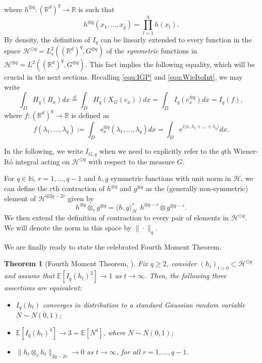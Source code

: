 \documentclass[12pt]{article}
\DeclareMathOperator{\1}{1}
\newcommand{\R}{\mathbb{R}}
\newcommand{\E}{\mathbb{E}}
\newcommand{\scp}[1]{\langle #1 \rangle}
\theoremstyle{plain}
\newtheorem{theorem}{Theorem}
\theoremstyle{definition}
\begin{document}
where $h^{\otimes q}:(\R^d)^q \to \R$ is such that \begin{equation}\label{equ:tensorproduct}
    h^{\otimes q} (x_1,\ldots,x_q) = \prod_{l=1}^q h(x_l).
\end{equation} 
By density, the definition of $I_q$ can be linearly extended to every function in the space $\mathcal{H}^{\odot q} = L^2_{s}((\R^{d})^q, G^{\otimes q})$ of the {\it symmetric} functions in $\mathcal{H}^{\otimes q} = L^2((\R^{d})^q, G^{\otimes q})$.  {This fact implies the following equality, which will be crucial in the next sections. Recalling \eqref{equ:IGP} and \eqref{equ:WieItoInt}, we may write
\begin{equation}
\int_{D}H_q\left(B_x\right)dx  \overset{d}{=} \int_{D}H_q\left(X_G(e_x)\right)dx =\int_{D}I_q\left(e_x^{\otimes q}\right)dx = I_{q}(f),
\end{equation}
where $f:(\R^{d})^q\rightarrow \R$ is defined as 
\begin{equation}
    f(\lambda_1,\dots,\lambda_q) := \int_{D}\mathrm e_x^{\otimes q}( \lambda_1,\dots,\lambda_q)   dx = \int_{D}\mathrm e^{i\langle x, \lambda_1+\dots+\lambda_q \rangle}  dx.
\end{equation}
}

In the following, we write $I_{G,q}$ when we need to explicitly refer to the $q$th Wiener-It\^o integral acting on $\mathcal{H}^{\odot q}$ with respect to the measure $G$. 

For $q\in\mathbb N$, $r=1,\ldots,q-1$ and $h,g$ symmetric functions with unit norm in $\mathcal{H}$, we can define the $r$th contraction of $h^{\otimes q}$ and $g^{\otimes q}$ as the (generally non-symmetric) element of $\mathcal H^{\otimes 2q-2r}$ given by \begin{equation}
    h^{\otimes q} \otimes_r g^{\otimes q} = \scp{h,g}_{\mathcal H}^{r} \,\,h^{\otimes q-r} \otimes g^{\otimes q-r}.
\end{equation}
We then extend the definition of contraction to every pair of elements in $\mathcal H^{\odot q}$. We will denote the norm in this space by $\|\cdot\|_q$.

We are finally ready to state the celebrated Fourth Moment Theorem.

\begin{theorem}[Fourth Moment Theorem, \cite{cltNuaPec}]\label{thm:4th}
    Fix $q\ge 2$, consider $(h_t)_{t>0}\subset \mathcal H^{\odot q}$ and assume that $\E[I_q(h_t)^2]\to 1$ as $t\to\infty$. Then, the following three assertions are equivalent: \begin{itemize}
        \item $I_q(h_t)$ converges in distribution to a standard Gaussian random variable $N\sim N(0,1)$;
        \item $\E[I_q(h_t)^4] \to 3=\E[N^4]$, where $N\sim N(0,1)$;
        \item $\|h_t\otimes_r h_t\|_{2q-2r}\to 0$ as $t\to\infty$, for all $r=1,\ldots, q-1$.
    \end{itemize}
\end{theorem}
\end{document}
